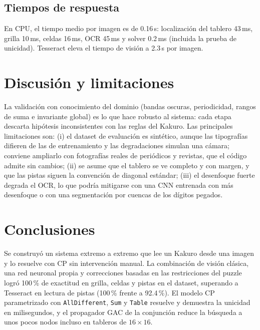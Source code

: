 \documentclass[conference,a4paper]{IEEEtran}\def\HAVEIEEE{1}%
\begin{document}
\subsection{Tiempos de respuesta}
En CPU, el tiempo medio por imagen es de 0.16\,s: localización del tablero 43\,ms, grilla 10\,ms, celdas 16\,ms, OCR 45\,ms y solver 0.2\,ms (incluida la prueba de unicidad). Tesseract eleva el tiempo de visión a 2.3\,s por imagen.

\section{Discusión y limitaciones}
La validación con conocimiento del dominio (bandas oscuras, periodicidad, rangos de suma e invariante global) es lo que hace robusto al sistema: cada etapa descarta hipótesis inconsistentes con las reglas del Kakuro. Las principales limitaciones son: (i) el dataset de evaluación es sintético, aunque las tipografías difieren de las de entrenamiento y las degradaciones simulan una cámara; conviene ampliarlo con fotografías reales de periódicos y revistas, que el código admite sin cambios; (ii) se asume que el tablero se ve completo y con margen, y que las pistas siguen la convención de diagonal estándar; (iii) el desenfoque fuerte degrada el OCR, lo que podría mitigarse con una CNN entrenada con más desenfoque o con una segmentación por cuencas de los dígitos pegados.

\section{Conclusiones}
Se construyó un sistema extremo a extremo que lee un Kakuro desde una imagen y lo resuelve con CP sin intervención manual. La combinación de visión clásica, una red neuronal propia y correcciones basadas en las restricciones del puzzle logró 100\,\% de exactitud en grilla, celdas y pistas en el dataset, superando a Tesseract en lectura de pistas (100\,\% frente a 92.4\,\%). El modelo CP parametrizado con \texttt{AllDifferent}, \texttt{Sum} y \texttt{Table} resuelve y demuestra la unicidad en milisegundos, y el propagador GAC de la conjunción reduce la búsqueda a unos pocos nodos incluso en tableros de $16\times16$.
\end{document}
